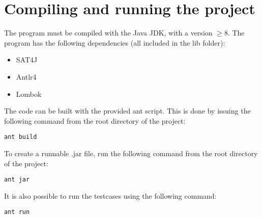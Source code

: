 \documentclass[a4paper]{article}
\begin{document}



\newpage
\appendix
\section{Compiling and running the project}
The program must be compiled with the Java JDK, with a version $\geq 8$. The program has the following dependencies (all included in the lib folder):
\begin{itemize}
\item SAT4J
\item Antlr4
\item Lombok
\end{itemize}

The code can be built with the provided ant script. This is done by issuing the following command from the root directory of the project:

\texttt{ant build}

To create a runnable .jar file, run the following command from the root directory of the project:

\texttt{ant jar}

It is also possible to run the testcases using the following command:

\texttt{ant run}
\end{document}
